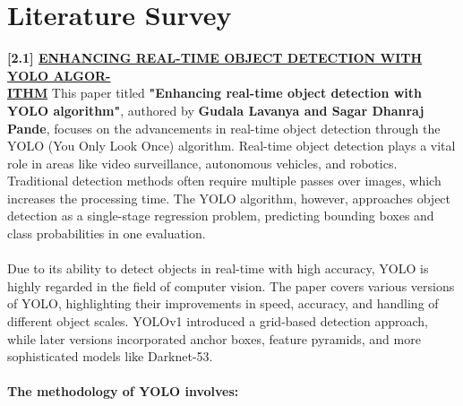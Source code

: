 \chapter{Literature Survey}
%
{ \textbf{[2.1] \underline{{ENHANCING REAL-TIME OBJECT DETECTION WITH YOLO ALGOR-}} \\ \underline{ITHM}}}\newline
\newline
%
This paper titled \textbf{"Enhancing real-time object detection with YOLO algorithm"}, authored by \textbf{Gudala Lavanya and Sagar Dhanraj Pande}, focuses on the advancements in real-time object detection through the YOLO (You Only Look Once) algorithm. Real-time object detection plays a vital role in areas like video surveillance, autonomous vehicles, and robotics. Traditional detection methods often require multiple passes over images, which increases the processing time. The YOLO algorithm, however, approaches object detection as a single-stage regression problem, predicting bounding boxes and class probabilities in one evaluation.\\\\
%
Due to its ability to detect objects in real-time with high accuracy, YOLO is highly regarded in the field of computer vision. The paper covers various versions of YOLO, highlighting their improvements in speed, accuracy, and handling of different object scales. YOLOv1 introduced a grid-based detection approach, while later versions incorporated anchor boxes, feature pyramids, and more sophisticated models like Darknet-53.\\\\
%
%
\textbf{The methodology of YOLO involves:}

